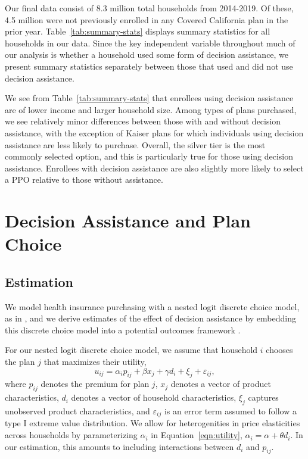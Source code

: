 \documentclass[12pt]{article}
\begin{document}
Our final data consist of 8.3 million total households from 2014-2019. Of these, 4.5 million were not previously enrolled in any Covered California plan in the prior year. Table~\ref{tab:summary-stats} displays summary statistics for all households in our data. Since the key independent variable throughout much of our analysis is whether a household used some form of decision assistance, we present summary statistics separately between those that used and did not use decision assistance. 

We see from Table~\ref{tab:summary-stats} that enrollees using decision assistance are of lower income and larger household size. Among types of plans purchased, we see relatively minor differences between those with and without decision assistance, with the exception of Kaiser plans for which individuals using decision assistance are less likely to purchase. Overall, the silver tier is the most commonly selected option, and this is particularly true for those using decision assistance. Enrollees with decision assistance are also slightly more likely to select a PPO relative to those without assistance.


\section{Decision Assistance and Plan Choice}
\label{sec:causal}

\subsection{Estimation}
\label{subsec:causal-methods}
We model health insurance purchasing with a nested logit discrete choice model, as in \cite{saltzman2019}, and we derive estimates of the effect of decision assistance by embedding this discrete choice model into a potential outcomes framework \citep{rubin1974, imbens2009}.

For our nested logit discrete choice model, we assume that household $i$ chooses the plan $j$ that maximizes their utility,
\begin{equation}
u_{ij} = \alpha_{i}p_{ij} + \beta x_{j} + \gamma d_{i} + \xi_{j} + \varepsilon_{ij}, 
\label{eqn:utility}
\end{equation}
where $p_{ij}$ denotes the premium for plan $j$, $x_{j}$ denotes a vector of product characteristics, $d_{i}$ denotes a vector of household characteristics, $\xi_{j}$ captures unobserved product characteristics, and $\varepsilon_{ij}$ is an error term assumed to follow a type I extreme value distribution. We allow for heterogenities in price elasticities across households by parameterizing $\alpha_{i}$ in Equation~\eqref{eqn:utility}, $\alpha_{i} = \alpha + \theta d_{i}.$ In our estimation, this amounts to including interactions between $d_{i}$ and $p_{ij}$.
\end{document}
